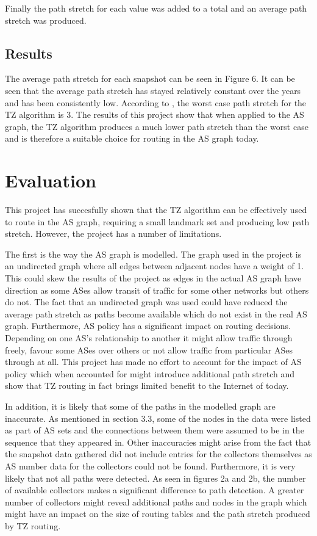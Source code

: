 \documentclass{dissertation/mpaper}
\begin{document}
Finally the path stretch for each value was added to a total and an average path stretch was produced.
\subsection{Results}

The average path stretch for each snapshot can be seen in Figure 6. It can be seen that the average path stretch has stayed relatively constant over the years and has been consistently low. According to \cite{thorup}, the worst case path stretch for the TZ algorithm is 3. The results of this project show that when applied to the AS graph, the TZ algorithm produces a much lower path stretch than the worst case and is therefore a suitable choice for routing in the AS graph today. 


\section{Evaluation}
This project has succesfully shown that the TZ algorithm can be effectively used to route in the AS graph, requiring a small landmark set and producing low path stretch. However, the project has a number of limitations.

The first is the way the AS graph is modelled. The graph used in the project is an undirected graph where all edges between adjacent nodes have a weight of 1. This could skew the results of the project as edges in the actual AS graph have direction as some ASes allow transit of traffic for some other networks but others do not. The fact that an undirected graph was used could have reduced the average path stretch as paths become available which do not exist in the real AS graph. Furthermore, AS policy has a significant impact on routing decisions. Depending on one AS's relationship to another it might allow traffic through freely, favour some ASes over others or not allow traffic from particular ASes through at all. This project has made no effort to account for the impact of AS policy which when accounted for might introduce additional path stretch and show that TZ routing in fact brings limited benefit to the Internet of today. 

In addition, it is likely that some of the paths in the modelled graph are inaccurate. As mentioned in section 3.3, some of the nodes in the data were listed as part of AS sets and the connections between them were assumed to be in the sequence that they appeared in. Other inaccuracies might arise from the fact that the snapshot data gathered did not include entries for the collectors themselves as AS number data for the collectors could not be found. Furthermore, it is very likely that not all paths were detected. As seen in figures 2a and 2b, the number of available collectors makes a significant difference to path detection. A greater number of collectors might reveal additional paths and nodes in the graph which might have an impact on the size of routing tables and the path stretch produced by TZ routing. 
\end{document}
